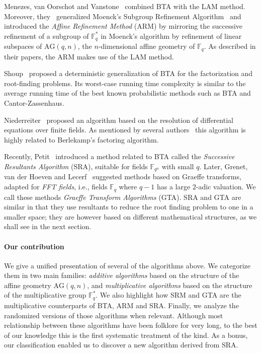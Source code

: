 \documentclass{article}
\newcommand{\ff}[1]{\mathbb{F}_{#1}}
\newcommand{\qq}{q}
\newcommand{\nn}{n}
\newcommand{\AG}{\mathrm{AG}(\qq,\nn)}
\newcounter{algo}
\begin{document}
Menezes, van Oorschot and Vanstone~\cite{MenezesOV88,OorschotV89}
combined BTA with the LAM method. Moreover, they~\cite{Menvanovans92}
generalized Moenck's Subgroup Refinement Algorithm~\cite{Moenck77} and
introduced the \emph{Affine Refinement Method} (ARM) by mirroring the
successive refinement of a subgroup of $\ff{q}^\ast$ in Moenck's
algorithm by refinement of linear subspaces of $\AG$, the
$n$-dimensional affine geometry of $\ff{q}$.  As described in their
papers, the ARM makes use of the LAM method.

Shoup~\cite{Shoup91b} proposed a deterministic generalization of BTA
for the factorization and root-finding problems. Its worst-case
running time complexity is similar to the average running time of the
best known probabilistic methods such as BTA and Cantor-Zassenhaus.

Niederreiter~\cite{nied94} proposed an algorithm based on the
resolution of differential equations over finite fields.  As mentioned
by several authors~\cite{Fleis96} this algorithm is highly related to
Berlekamp's factoring algorithm.

Recently, Petit~\cite{cgUCL-P14} introduced a method related to BTA
called the \emph{Successive Resultants Algorithm} (SRA), suitable for
fields $\ff{q^n}$ with small $q$. Later, Grenet, van der Hoeven and
Lecerf~\cite{grenet-hoeven-lecerf-roots,grenet2015deterministic}
suggested methods based on Graeffe transforms, adapted for \emph{FFT
  fields}, i.e., fields $\ff{q}$ where $q-1$ has a large $2$-adic
valuation. We call these methods \emph{Graeffe Transform Algorithms}
(GTA). SRA and GTA are similar in that they use resultants to reduce
the root finding problem to one in a smaller space; they are however based
on different mathematical structures, as we shall see in the next
section.


\paragraph{Our contribution}
We give a unified presentation of several of the algorithms above. We
categorize them in two main families: \emph{additive algorithms} based
on the structure of the affine geometry $\AG$, and
\emph{multiplicative algorithms} based on the structure of the
multiplicative group $\ff{q}^\ast$.  We also highlight how SRM and GTA
are the multiplicative counterparts of BTA, ARM and SRA.  Finally, we
analyze the randomized versions of those algorithms when relevant.
Although most relationship between these algorithms have been folklore
for very long, to the best of our knowledge this is the first
systematic treatment of the kind. As a bonus, our classification
enabled us to discover a new algorithm derived from SRA.
\end{document}
